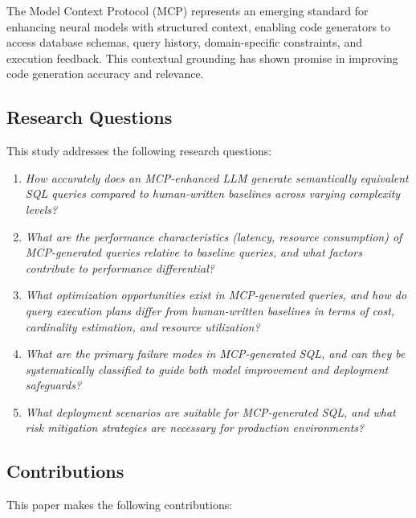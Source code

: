 The Model Context Protocol (MCP) \cite{anthropic2024mcp} represents an emerging standard for enhancing neural models with structured context, enabling code generators to access database schemas, query history, domain-specific constraints, and execution feedback. This contextual grounding has shown promise in improving code generation accuracy and relevance.

\subsection{Research Questions}

This study addresses the following research questions:

\begin{enumerate}
    \item[RQ1:] \textit{How accurately does an MCP-enhanced LLM generate semantically equivalent SQL queries compared to human-written baselines across varying complexity levels?}
    
    \item[RQ2:] \textit{What are the performance characteristics (latency, resource consumption) of MCP-generated queries relative to baseline queries, and what factors contribute to performance differential?}
    
    \item[RQ3:] \textit{What optimization opportunities exist in MCP-generated queries, and how do query execution plans differ from human-written baselines in terms of cost, cardinality estimation, and resource utilization?}
    
    \item[RQ4:] \textit{What are the primary failure modes in MCP-generated SQL, and can they be systematically classified to guide both model improvement and deployment safeguards?}
    
    \item[RQ5:] \textit{What deployment scenarios are suitable for MCP-generated SQL, and what risk mitigation strategies are necessary for production environments?}
\end{enumerate}

\subsection{Contributions}

This paper makes the following contributions:

